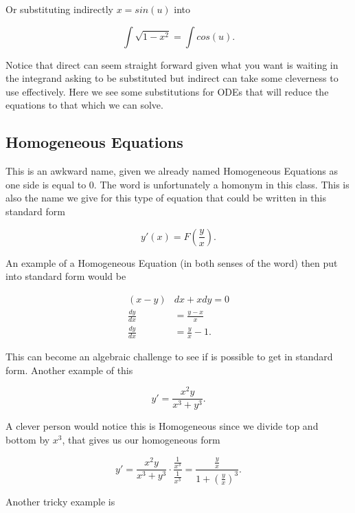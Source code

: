 \documentclass[12pt]{article}
\begin{document}
Or substituting indirectly $x=sin(u)$ into

\begin{equation*}
    \int \sqrt{1-x^2} = \int cos(u).
\end{equation*}

Notice that direct can seem straight forward given what you want is waiting in the integrand asking to be substituted but indirect can take some cleverness to use effectively. Here we see some substitutions for ODEs that will reduce the equations to that which we can solve.

\subsection{Homogeneous Equations}

This is an awkward name, given we already named Homogeneous Equations as one side is equal to $0$. The word is unfortunately a homonym in this class. This is also the name we give for this type of equation that could be written in this standard form

\begin{equation*}
    y'(x) = F\left(\frac{y}{x}\right).
\end{equation*}

An example of a Homogeneous Equation (in both senses of the word) then put into standard form would be

\begin{align*}
    (x-y)&dx+xdy=0 \\
    \frac{dy}{dx} &= \frac{y-x}{x} \\
    \frac{dy}{dx} &= \frac{y}{x}-1. 
\end{align*}

This can become an algebraic challenge to see if is possible to get in standard form. Another example of this

\begin{equation*}
    y' = \frac{x^2y}{x^3+y^3}.
\end{equation*}

A clever person would notice this is Homogeneous since we divide top and bottom by $x^3$, that gives us our homogeneous form

\begin{equation*}
    y' = \frac{x^2y}{x^3+y^3}\cdot \frac{\frac{1}{x^3}}{\frac{1}{x^3}} = \frac{\frac{y}{x}}{1+(\frac{y}{x})^3}.
\end{equation*}

Another tricky example is
\end{document}
